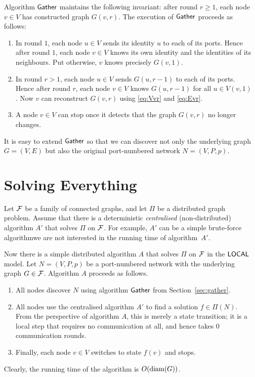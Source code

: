 Algorithm $\textsf{Gather}$ maintains the following invariant: after round $r \ge 1$, each node $v \in V$ has constructed graph $G(v,r)$. The execution of $\textsf{Gather}$ proceeds as follows:
\begin{enumerate}
    \item In round $1$, each node $u \in V$ sends its identity $u$ to each of its ports. Hence after round $1$, each node $v \in V$ knows its own identity and the identities of its neighbours. Put otherwise, $v$ knows precisely $G(v,1)$.
    \item In round $r > 1$, each node $u \in V$ sends $G(u,r-1)$ to each of its ports. Hence after round $r$, each node $v \in V$ knows $G(u,r-1)$ for all $u \in V(v,1)$. Now $v$ can reconstruct $G(v,r)$ using \eqref{eq:Vvr} and \eqref{eq:Evr}.
    \item A node $v \in V$ can stop once it detects that the graph $G(v,r)$ no longer changes.
\end{enumerate}

It is easy to extend $\textsf{Gather}$ so that we can discover not only the underlying graph $G = (V,E)$ but also the original port-numbered network $N = (V,P,p)$.


\section{Solving Everything}

Let $\mathcal{F}$ be a family of connected graphs, and let $\Pi$ be a distributed graph problem. Assume that there is a deterministic \emph{centralised} (non-distributed) algorithm $A'$ that solves $\Pi$ on $\mathcal{F}$. For example, $A'$ can be a simple brute-force algorithm\mydash we are not interested in the running time of algorithm~$A'$.

Now there is a simple distributed algorithm $A$ that solves $\Pi$ on $\mathcal{F}$ in the $\textsf{LOCAL}$ model. Let $N = (V,P,p)$ be a port-numbered network with the underlying graph $G \in \mathcal{F}$. Algorithm $A$ proceeds as follows.
\begin{enumerate}
    \item All nodes discover $N$ using algorithm $\textsf{Gather}$ from Section~\ref{sec:gather}.
    \item All nodes use the centralised algorithm $A'$ to find a solution $f \in \Pi(N)$. From the perspective of algorithm $A$, this is merely a state transition; it is a local step that requires no communication at all, and hence takes $0$ communication rounds.
    \item Finally, each node $v \in V$ switches to state $f(v)$ and stops.
\end{enumerate}
Clearly, the running time of the algorithm is $O(\operatorname{diam}(G))$.

